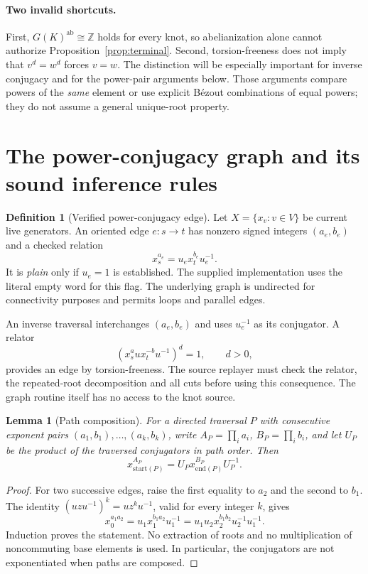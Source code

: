 \documentclass[11pt]{article}
\newtheorem{lemma}[theorem]{Lemma}
\theoremstyle{definition}\newtheorem{definition}[theorem]{Definition}
\theoremstyle{remark}\newtheorem{remark}[theorem]{Remark}
\newcommand{\Z}{\mathbb Z}\newcommand{\Q}{\mathbb Q}\newcommand{\F}{\mathbb F}
\begin{document}
\paragraph{Two invalid shortcuts.}
First, $G(K)^{\mathrm{ab}}\cong\Z$ holds for every knot, so abelianization
alone cannot authorize Proposition~\ref{prop:terminal}. Second,
torsion-freeness does not imply that $v^d=w^d$ forces $v=w$.
The distinction will be especially important for inverse conjugacy and
for the power-pair arguments below. Those arguments compare powers of the
\emph{same} element or use explicit B\'ezout combinations of equal powers;
they do not assume a general unique-root property.

\section{The power-conjugacy graph and its sound inference rules}
\label{sec:calculus}
\begin{definition}[Verified power-conjugacy edge]
Let $X=\{x_v:v\in V\}$ be current live generators. An oriented edge $e:s\to t$
has nonzero signed integers $(a_e,b_e)$ and a checked relation
\begin{equation}\label{eq:edge}
 x_s^{a_e}=u_e x_t^{b_e}u_e^{-1}.
\end{equation}
It is \emph{plain} only if $u_e=1$ is established. The supplied implementation
uses the literal empty word for this flag. The underlying graph is
undirected for connectivity purposes and permits loops and parallel edges.
\end{definition}
An inverse traversal interchanges $(a_e,b_e)$ and uses $u_e^{-1}$ as its
conjugator. A relator
\begin{equation}\label{eq:donor}
 (x_s^a u x_t^{-b}u^{-1})^d=1,\qquad d>0,
\end{equation}
provides an edge by torsion-freeness. The source replayer must check the
relator, the repeated-root decomposition and all cuts before using this
consequence. The graph routine itself has no access to the knot source.

\begin{lemma}[Path composition]\label{lem:path}
For a directed traversal $P$ with consecutive exponent pairs
$(a_1,b_1),\ldots,(a_k,b_k)$, write
$A_P=\prod_i a_i$, $B_P=\prod_i b_i$, and let $U_P$ be the product of the
traversed conjugators in path order. Then
\begin{equation}\label{eq:path}
 x_{\mathrm{start}(P)}^{A_P}
 =U_P x_{\mathrm{end}(P)}^{B_P}U_P^{-1}.
\end{equation}
\end{lemma}
\begin{proof}
For two successive edges, raise the first equality to $a_2$ and the second
to $b_1$. The identity $(u z u^{-1})^k=u z^k u^{-1}$, valid for every
integer $k$, gives
\[
 x_0^{a_1a_2}
 =u_1 x_1^{b_1a_2}u_1^{-1}
 =u_1u_2 x_2^{b_1b_2}u_2^{-1}u_1^{-1}.
\]
Induction proves the statement. No extraction of roots and no multiplication
of noncommuting base elements is used. In particular, the conjugators are
not exponentiated when paths are composed.
\end{proof}
\end{document}
